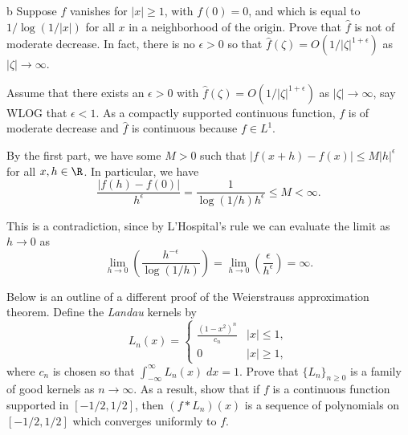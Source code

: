 \documentclass[11pt,letterpaper]{article}
\begin{document}
\begin{solution}
    \begin{partproblem}{b}
        Suppose $f$ vanishes for $|x|\geq 1$, with $f(0)=0$, and which is equal to $1 / \log (1 /|x|)$ for all $x$ in a neighborhood of the origin. Prove that $\widehat{f}$ is not of moderate decrease. In fact, there is no $\epsilon > 0$ so that $\widehat{f}(\zeta)=O(1/|\zeta|^{1+\epsilon})$ as $|\zeta| \to \infty$. 
    \end{partproblem}

    \tengwarannatar
    \quad Assume that there exists an $\epsilon > 0$ with $\widehat{f}(\zeta) = O(1 /|\zeta|^{1+\epsilon})$ as $|\zeta|\to \infty$, say WLOG that $\epsilon < 1$. As a compactly supported continuous function, $f$ is of moderate decrease and $\widehat{f}$ is continuous because $f\in L^1$. 

    \quad By the first part, we have some $M > 0$ such that $|f(x+h)-f(x)| \leq M|h|^{\epsilon}$ for all $x, h\in \R$. In particular, we have \[\frac{|f(h)-f(0)|}{h^{\epsilon}} = \frac{1}{\log( 1/h) h^{\epsilon}} \leq M < \infty.\]

    This is a contradiction, since by L'Hospital's rule we can evaluate the limit as $h\to 0$ as
    \[
        \lim_{h \to 0} \left(\frac{h^{-\epsilon}}{\log(1/h)}\right) = \lim_{h \to 0} \left(\frac{\epsilon}{h^\epsilon}\right) = \infty
    .\] 
\end{solution}

\begin{problem}
    Below is an outline of a different proof of the Weierstrauss approximation theorem. Define the \emph{Landau} kernels by
    \[
        L_n(x)=\begin{cases}
            \frac{(1-x^2)^n}{c_n} & |x|\leq 1,\\
            0 & |x|\geq 1,
        \end{cases}
    \] 
    where $c_n$ is chosen so that $\int^\infty_{-\infty}L_n(x)\;dx =1$. Prove that $\{L_n\}_{n\geq 0}$ is a family of good kernels as $n\to \infty$. As a result, show that if $f$ is a continuous function supported in $[-1 /2, 1/2]$, then $(f * L_n)(x)$ is a sequence of polynomials on $[-1 /2, 1 /2]$ which converges uniformly to $f$. %
\end{problem}
\end{document}
